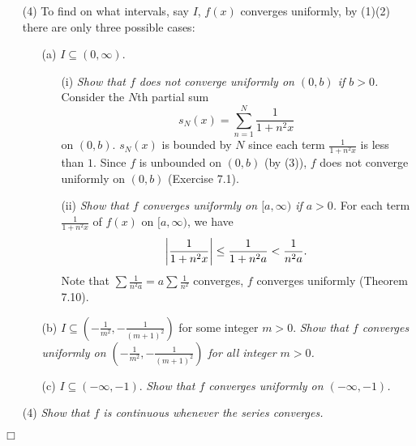 \documentclass{article}
\begin{document}
\begin{enumerate}
\item[(4)]
  To find on what intervals, say $I$, $f(x)$ converges uniformly, by (1)(2)
  there are only three possible cases:
  \begin{enumerate}
    \item[(a)]
      $I \subseteq (0,\infty)$.
      \begin{enumerate}
        \item[(i)]
          \emph{Show that $f$ does not converge uniformly on $(0,b)$ if $b > 0$.}
          Consider the $N$th partial sum
          \[
            s_N(x) = \sum_{n=1}^{N} \frac{1}{1+n^2x}
          \]
          on $(0,b)$.
          $s_N(x)$ is bounded by $N$ since each term $\frac{1}{1+n^2x}$ is less than $1$.
          Since $f$ is unbounded on $(0,b)$ (by (3)),
          $f$ does not converge uniformly on $(0,b)$ (Exercise 7.1).

        \item[(ii)]
          \emph{Show that $f$ converges uniformly on $[a,\infty)$ if $a > 0$.}
          For each term $\frac{1}{1+n^2x}$ of $f(x)$ on $[a,\infty)$, we have
          \[
            \abs{\frac{1}{1+n^2x}}
            \leq \frac{1}{1+n^2a}
            < \frac{1}{n^2a}.
          \]
          Note that $\sum \frac{1}{n^2a} = a \sum \frac{1}{n^2}$ converges,
          $f$ converges uniformly (Theorem 7.10).
      \end{enumerate}

    \item[(b)]
      $I \subseteq \left(-\frac{1}{m^2}, -\frac{1}{(m+1)^2}\right)$
      for some integer $m > 0$.
      \emph{Show that $f$ converges uniformly on
      $\left(-\frac{1}{m^2}, -\frac{1}{(m+1)^2}\right)$ for all integer $m > 0$.}

    \item[(c)]
      $I \subseteq (-\infty,-1)$.
      \emph{Show that $f$ converges uniformly on $(-\infty,-1)$.}

  \end{enumerate}

\item[(4)]
  \emph{Show that $f$ is continuous whenever the series converges.}

\end{enumerate}
$\Box$ \\\\



\end{document}
